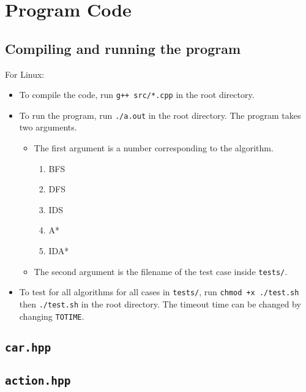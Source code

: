 \documentclass[12pt, a4paper]{article}
\begin{document}


\section{Program Code}

\subsection{Compiling and running the program}

For Linux:

\begin{itemize}
    \item To compile the code, run {\tt g++ src/*.cpp} in the root directory.

    \item To run the program, run {\tt ./a.out} in the root directory. The program takes two arguments.
    \begin{itemize}
        \item The first argument is a number corresponding to the algorithm.
        \begin{enumerate}
            \item BFS
            \item DFS
            \item IDS
            \item A*
            \item IDA*
        \end{enumerate}
        \item The second argument is the filename of the test case inside {\tt tests/}.
    \end{itemize}

    \item To test for all algorithms for all cases in {\tt tests/}, run {\tt chmod +x ./test.sh} then {\tt ./test.sh} in the root directory. The timeout time can be changed by changing {\tt TOTIME}.

\end{itemize}

\subsection{{\tt car.hpp}}


\subsection{{\tt action.hpp}}

\end{document}
